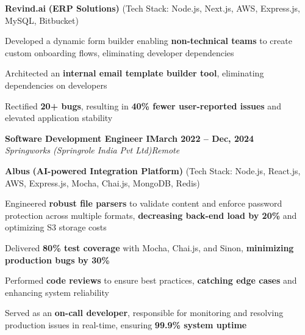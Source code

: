 \documentclass[letterpaper, 10pt]{article}
\newcommand{\heading}[2]{ \hspace{5pt}#1\hfill#2\\[1pt] }
\newcommand{\headingBf}[2]{ \heading{\textbf{#1}}{\textbf{#2}} }
\newcommand{\headingIt}[2]{ \heading{\textit{#1}}{\textit{#2}} }
\newenvironment{resume_list}{
\vspace{-3pt}
\begin{itemize}[itemsep=0.5pt, parsep=0.5pt, leftmargin=18pt] }{ \end{itemize}
\vspace{-3pt}
}
\begin{document}
\vspace{5pt}

\hspace{10pt}\textbf{Revind.ai} \textbf{(ERP Solutions)} \small{(Tech Stack: Node.js, Next.js, AWS, Express.js, MySQL, Bitbucket)}
\begin{resume_list}
    \item Developed a dynamic form builder enabling \textbf{non-technical teams} to create custom onboarding flows, eliminating developer dependencies
    \item Architected an \textbf{internal email template builder tool}, eliminating dependencies on developers
    \item Rectified \textbf{20+ bugs}, resulting in \textbf{40\% fewer user-reported issues} and elevated application stability
\end{resume_list}

\vspace{6pt}

\headingBf{Software Development Engineer I}{March 2022 -- Dec, 2024}
\headingIt{Springworks (Springrole India Pvt Ltd)}{Remote}

\vspace{5pt}

\hspace{10pt}\textbf{Albus} \textbf{(AI-powered Integration Platform)} \small{(Tech Stack: Node.js, React.js, AWS, Express.js, Mocha, Chai.js, MongoDB, Redis)}
\begin{resume_list}
    \item Engineered \textbf{robust file parsers} to validate content and enforce password protection across multiple formats, \textbf{decreasing back-end load by 20\%} and optimizing S3 storage costs 
    \item Delivered \textbf{80\% test coverage} with Mocha, Chai.js, and Sinon, \textbf{minimizing production bugs by 30\%}
    \item Performed \textbf{code reviews} to ensure best practices, \textbf{catching edge cases} and enhancing system reliability
    \item Served as an \textbf{on-call developer}, responsible for monitoring and resolving production issues in real-time, ensuring \textbf{99.9\% system uptime}
\end{resume_list}

\vspace{4pt}
\end{document}
